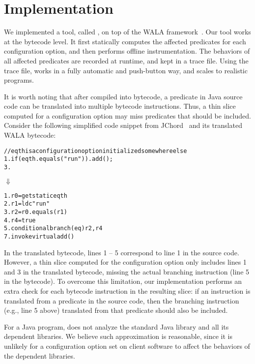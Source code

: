 \section{Implementation}
\label{sec:implementation}

We implemented a tool, called \ourtool, on top of the WALA
framework~\cite{wala}. Our tool works at the bytecode level.
It first statically computes the affected predicates
for each configuration option, and then performs offline instrumentation.
The behaviors of all affected predicates are recorded at runtime, and
kept in a trace file. Using the trace file,
\ourtool works in a fully automatic and
push-button way, and scales to realistic programs.

It is worth noting that after compiled into bytecode,
a predicate in Java source code can be translated into multiple bytecode
instructions. Thus, a thin slice computed for a configuration
option may miss predicates that should be included.
Consider the following simplified code snippet from JChord~\cite{jchord}
and its translated WALA bytecode:


\begin{CodeOut}
\begin{alltt}
   // eqth is a configuration option initialized somewhere else
1. if (eqth.equals("run")) .   add();
3. \ttrcb
\end{alltt}
\end{CodeOut}
\vspace{-2mm}
\hspace{20mm}$\Downarrow$ 
\begin{CodeOut}
\begin{alltt}
1. r0 = getstatic eqth
2. r1 = ldc "run"
3. r2 = r0.equals(r1)
4. r4 = true
5. conditional branch(eq) r2, r4
7. invokevirtual add() 
\end{alltt}
\end{CodeOut}

In the translated bytecode, lines 1 -- 5 correspond to line 1 in the
source code. However, a thin slice computed
for the configuration option  only includes lines 1 and 3
in the translated bytecode, missing the actual branching
instruction (line 5 in the bytecode).
To overcome this limitation, our implementation performs an extra check
for each bytecode instruction in the resulting slice:
if an instruction 
is translated from a predicate in the source code, then the
branching instruction (e.g., line 5 above) translated
from that predicate should also be included.


For a Java program, \ourtool does not analyze the standard Java
library and all its dependent libraries. We believe such approximation
is reasonable, since it is
unlikely for a configuration option set on client software
to affect the behaviors of the dependent libraries.

